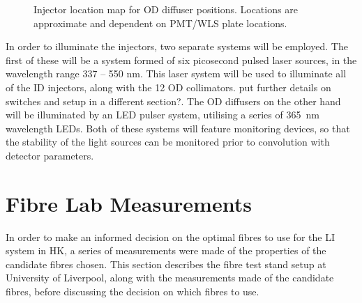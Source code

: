 \documentclass[a4paper,11pt]{article}
\begin{document}
\begin{figure}[h]
\centering
{}
\caption{Injector location map for OD diffuser positions. Locations are approximate and dependent on PMT/WLS plate locations.}\label{fig:ODdiffmap}
\end{figure}

In order to illuminate the injectors, two separate systems will be employed. The first of these will be a system formed of six picosecond pulsed laser sources, in the wavelength range 337 -- 550 nm. This laser system will be used to illuminate all of the ID injectors, along with the 12 OD collimators. {\color{red} put further details on switches and setup in a different section?}. The OD diffusers on the other hand will be illuminated by an LED pulser system, utilising a series of 365~nm wavelength LEDs. Both of these systems will feature monitoring devices, so that the stability of the light sources can be monitored prior to convolution with detector parameters.


\section{Fibre Lab Measurements}

In order to make an informed decision on the optimal fibres to use for the LI system in HK, a series of measurements were made of the properties of the candidate fibres chosen. This section describes the fibre test stand setup at University of Liverpool, along with the measurements made of the candidate fibres, before discussing the decision on which fibres to use.
\end{document}
